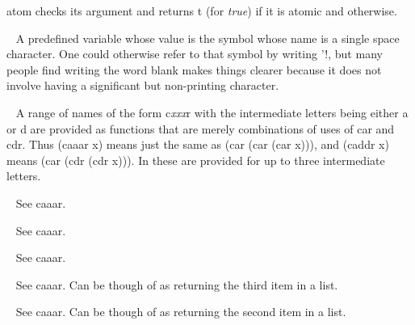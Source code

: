 \begin{description}
{\tx atom} checks its argument and returns {\tx t} (for {\em true})
if it is atomic and \nil{} otherwise.
\item[{\tx blank~~~~~~~~} \hspace{1cm} {\em predefined variable}]~\newline
A predefined variable whose value is the symbol whose name is a single
space character. One could otherwise refer to that symbol by writing
{\tx '!\textvisiblespace}, but many people find writing the
word {\tx blank} makes things clearer because it does not involve
having a significant but non-printing character.
\item[{\tx caaar~~~~~~~~} \hspace{1cm} {\em function 1 arg}]~\newline
A range of names of the form {\tx c}{\em xxx}{\tx r} with the
intermediate letters being either {\tx a} or {\tx d} are
provided as functions that are merely combinations of uses of {\tx car}
and {\tx cdr}. Thus {\tx (caaar x)} means just the same
as {\tx (car (car (car x)))}, and {\tx (caddr x)} means 
{\tx (car (cdr (cdr x)))}. In \vsl{} these are provided for up to three
intermediate letters. 
\item[{\tx caadr~~~~~~~~} \hspace{1cm} {\em function 1 arg}]~\newline
See {\tx caaar}.
\item[{\tx caar~~~~~~~~~} \hspace{1cm} {\em function 1 arg}]~\newline
See {\tx caaar}.
\item[{\tx cadar~~~~~~~~} \hspace{1cm} {\em function 1 arg}]~\newline
See {\tx caaar}.
\item[{\tx caddr~~~~~~~~} \hspace{1cm} {\em function 1 arg}]~\newline
See {\tx caaar}. Can be though of as returning the third item in a list.
\item[{\tx cadr~~~~~~~~~} \hspace{1cm} {\em function 1 arg}]~\newline
See {\tx caaar}. Can be though of as returning the second item in a list.
\item[{\tx car~~~~~~~~~~} \hspace{1cm} {\em function 1 arg}]~\newline

\end{description}
